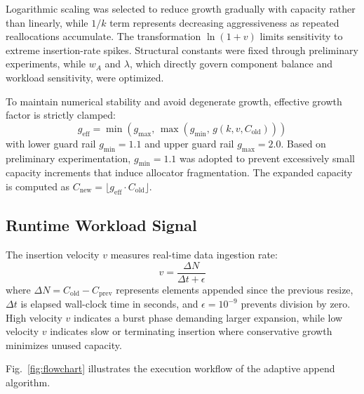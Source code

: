 \documentclass[conference]{IEEEtran}
\begin{document}
Logarithmic scaling was selected to reduce growth gradually with capacity rather than linearly, while $1/k$ term represents decreasing aggressiveness as repeated reallocations accumulate. The transformation $\ln(1+v)$ limits sensitivity to extreme insertion-rate spikes. Structural constants were fixed through preliminary experiments, while $w_A$ and $\lambda$, which directly govern component balance and workload sensitivity, were optimized.

To maintain numerical stability and avoid degenerate growth, effective growth factor is strictly clamped:
\begin{equation}
    g_{\text{eff}} = \min\!\left(g_{\max},\, \max\!\left(g_{\min},\, g(k,v,C_{\text{old}})\right)\right)
    \label{eq:clamped}
\end{equation}
with lower guard rail $g_{\min} = 1.1$ and upper guard rail $g_{\max} = 2.0$. Based on preliminary experimentation, $g_{\min} = 1.1$ was adopted to prevent excessively small capacity increments that induce allocator fragmentation. The expanded capacity is computed as $C_{\text{new}} = \lfloor g_{\text{eff}} \cdot C_{\text{old}} \rfloor$.

\subsection{Runtime Workload Signal}
The insertion velocity $v$ measures real-time data ingestion rate:
\begin{equation}
    v = \frac{\Delta N}{\Delta t + \epsilon}
\end{equation}
where $\Delta N = C_{\text{old}} - C_{\text{prev}}$ represents elements appended since the previous resize, $\Delta t$ is elapsed wall-clock time in seconds, and $\epsilon = 10^{-9}$ prevents division by zero. High velocity $v$ indicates a burst phase demanding larger expansion, while low velocity $v$ indicates slow or terminating insertion where conservative growth minimizes unused capacity.

Fig.~\ref{fig:flowchart} illustrates the execution workflow of the adaptive append algorithm.
\end{document}
